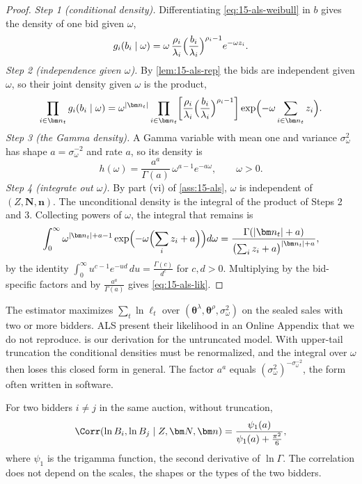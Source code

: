 \begin{proof}
\emph{Step 1 (conditional density).} Differentiating \eqref{eq:15-als-weibull} in $b$ gives the density of
one bid given $\omega$,
\[
g_i(b_i\mid\omega)=\omega\,\frac{\rho_i}{\lambda_i}\Bigl(\frac{b_i}{\lambda_i}\Bigr)^{\rho_i-1}e^{-\omega z_i}.
\]
\emph{Step 2 (independence given $\omega$).} By \cref{lem:15-als-rep} the bids are independent given
$\omega$, so their joint density given $\omega$ is the product,
\[
\prod_{i\in\bm n_t}g_i(b_i\mid\omega)=\omega^{|\bm n_t|}\prod_{i\in\bm n_t}\biggl[\frac{\rho_i}{\lambda_i}\Bigl(\frac{b_i}{\lambda_i}\Bigr)^{\rho_i-1}\biggr]\exp\Bigl(-\omega\sum_{i\in\bm n_t}z_i\Bigr).
\]
\emph{Step 3 (the Gamma density).} A Gamma variable with mean one and variance $\sigma^2_\omega$ has shape
$a=\sigma_\omega^{-2}$ and rate $a$, so its density is
\[
h(\omega)=\frac{a^a}{\Gamma(a)}\,\omega^{a-1}e^{-a\omega},\qquad\omega>0 .
\]
\emph{Step 4 (integrate out $\omega$).} By part (vi) of \cref{ass:15-als}, $\omega$ is independent of
$(Z,\bm N,\bm n)$. The unconditional density is the integral of the product of Steps 2 and 3. Collecting
powers of $\omega$, the integral that remains is
\[
\int_0^\infty\omega^{|\bm n_t|+a-1}\exp\Bigl(-\omega\Bigl(\sum_{i}z_i+a\Bigr)\Bigr)d\omega
=\frac{\Gamma(|\bm n_t|+a)}{\bigl(\sum_iz_i+a\bigr)^{|\bm n_t|+a}},
\]
by the identity $\int_0^\infty u^{c-1}e^{-ud}\,du=\frac{\Gamma(c)}{d^{c}}$ for $c,d>0$. Multiplying by the
bid-specific factors and by $\frac{a^a}{\Gamma(a)}$ gives \eqref{eq:15-als-lik}.
\end{proof}

The estimator maximizes $\sum_t\ln\ell_t$ over $(\bm\theta^\lambda,\bm\theta^\rho,\sigma^2_\omega)$ on the
sealed sales with two or more bidders. ALS present their likelihood in an Online Appendix that we do not
reproduce.  is our derivation for the untruncated model. With upper-tail truncation
the conditional densities must be renormalized, and the integral over $\omega$ then loses this closed form
in general. The factor $a^a$ equals $(\sigma^2_\omega)^{-\sigma_\omega^{-2}}$, the form often written in
software.

\begin{corollary}\label{cor:15-als-corr}
For two bidders $i\ne j$ in the same auction, without truncation,
\[
\Corr(\ln B_i,\ln B_j\mid Z,\bm N,\bm n)=\frac{\psi_1(a)}{\psi_1(a)+\frac{\pi^2}{6}},
\]
where $\psi_1$ is the trigamma function, the second derivative of $\ln\Gamma$. The correlation does not
depend on the scales, the shapes or the types of the two bidders.
\end{corollary}

